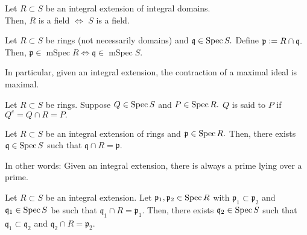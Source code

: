 \documentclass[12pt]{article}	%
\DeclareMathOperator{\mSpec}{mSpec}
\begin{document}
\begin{lem} 
	Let $R \subset S$ be an integral extension of integral domains. \\
	Then, $R$ is a field $\Leftrightarrow$ $S$ is a field.
\end{lem}

\begin{cor}
	Let $R \subset S$ be rings (not necessarily domains) and $\mathfrak{q} \in \operatorname{Spec} S.$ Define $\mathfrak{p} \vcentcolon= R \cap \mathfrak{q}.$ \\
	Then, $\mathfrak{p} \in \mSpec R \Leftrightarrow \mathfrak{q} \in \mSpec S.$

	In particular, given an integral extension, the contraction of a maximal ideal is maximal.
\end{cor}

\begin{defn}%
	Let $R \subset S$ be rings. Suppose $Q \in \operatorname{Spec} S$ and $P \in \operatorname{Spec} R.$ $Q$ is said to  $P$ if $Q^c = Q \cap R = P.$
\end{defn}

\begin{thm}
	Let $R \subset S$ be an integral extension of rings and $\mathfrak{p} \in \operatorname{Spec} R.$ Then, there exists $\mathfrak{q} \in \operatorname{Spec} S$ such that $\mathfrak{q} \cap R = \mathfrak{p}.$

	In other words: Given an integral extension, there is always a prime lying over a prime.
\end{thm}

\begin{thm}
	Let $R \subset S$ be an integral extension. Let $\mathfrak{p}_1, \mathfrak{p}_2 \in \operatorname{Spec} R$ with $\mathfrak{p}_1 \subset \mathfrak{p}_2$ and $\mathfrak{q}_1 \in \operatorname{Spec} S$ be such that $\mathfrak{q}_1 \cap R = \mathfrak{p}_1.$ Then, there exists $\mathfrak{q}_2 \in \operatorname{Spec} S$ such that $\mathfrak{q}_1 \subset \mathfrak{q}_2$ and $\mathfrak{q}_2 \cap R = \mathfrak{p}_2.$
\end{thm}
\begin{center}
\end{center}
\end{document}
